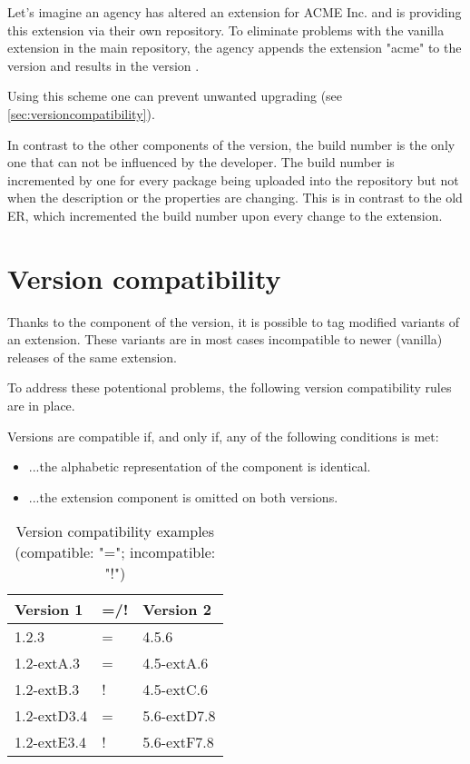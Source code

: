 Let's imagine an agency has altered an extension for ACME Inc. and is providing this extension via their own repository.
To eliminate problems with the vanilla extension in the main repository, the agency appends the extension "acme" to the version and results in the version
.

Using this scheme one can prevent unwanted upgrading (see \ref{sec:versioncompatibility}).

In contrast to the other components of the version, the build number is the only one that can not be influenced by the developer. The build number is incremented by one for every package being uploaded into the repository but not when the description or the properties are changing. This is in contrast to the old ER, which incremented the build number upon every change to the extension.


\section[sec:versioncompatibility]{Version compatibility}
Thanks to the  component of the version, it is possible to tag modified variants of an extension. These variants are in most cases incompatible to newer (vanilla) releases of the same extension.

To address these potentional problems, the following version compatibility rules are in place.

Versions are compatible if, and only if, any of the following conditions is met:
\begin{itemize}
  \item ...the alphabetic representation of the  component is identical.
  \item ...the extension component is omitted on both versions.
\end{itemize}

\small
\begin{longtable}{|p{}|p{}|p{}|}
\caption{Version compatibility examples (compatible: "="; incompatible: "!")} \\
\hline
\label{tab:versioncompatexamples}
\textbf{Version 1} & \textbf{=/!} & \textbf{Version 2} \\
\hline
 1.2.3 & = & 4.5.6
\\ \hline
 1.2-extA.3 & = & 4.5-extA.6
\\ \hline
 1.2-extB.3 & ! & 4.5-extC.6
\\ \hline
 1.2-extD3.4 & = & 5.6-extD7.8
\\ \hline
 1.2-extE3.4 & ! & 5.6-extF7.8
\\ \hline
\end{longtable}
\normalsize

